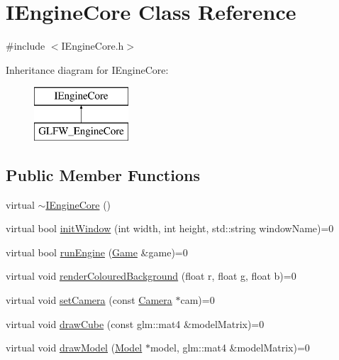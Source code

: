\hypertarget{class_i_engine_core}{}\section{I\+Engine\+Core Class Reference}
\label{class_i_engine_core}


{\ttfamily \#include $<$I\+Engine\+Core.\+h$>$}

Inheritance diagram for I\+Engine\+Core\+:\begin{figure}[H]
\begin{center}
\leavevmode
\includegraphics[height=2.000000cm]{class_i_engine_core}
\end{center}
\end{figure}
\subsection*{Public Member Functions}
\begin{DoxyCompactItemize}
\item 
virtual \mbox{\hyperlink{class_i_engine_core_a500720d444543140a1f4f1f80e03d87a}{$\sim$\+I\+Engine\+Core}} ()
\item 
virtual bool \mbox{\hyperlink{class_i_engine_core_a27123704f8f24eefd9cb47aa9986cbf3}{init\+Window}} (int width, int height, std\+::string window\+Name)=0
\item 
virtual bool \mbox{\hyperlink{class_i_engine_core_ad03940f571ec20ba7427feeca44ace21}{run\+Engine}} (\mbox{\hyperlink{class_game}{Game}} \&game)=0
\item 
virtual void \mbox{\hyperlink{class_i_engine_core_a8f8e0778f04c50b680cdde167cb38e2f}{render\+Coloured\+Background}} (float r, float g, float b)=0
\item 
virtual void \mbox{\hyperlink{class_i_engine_core_ab2f643ce25708c87b20eecdcbb18b9ac}{set\+Camera}} (const \mbox{\hyperlink{class_camera}{Camera}} $\ast$cam)=0
\item 
virtual void \mbox{\hyperlink{class_i_engine_core_af24745492d6a7c8bd410a6849fbaf854}{draw\+Cube}} (const glm\+::mat4 \&model\+Matrix)=0
\item 
virtual void \mbox{\hyperlink{class_i_engine_core_a454b3f14b3a567852d891c7543edfef7}{draw\+Model}} (\mbox{\hyperlink{class_model}{Model}} $\ast$model, glm\+::mat4 \&model\+Matrix)=0
\end{DoxyCompactItemize}


